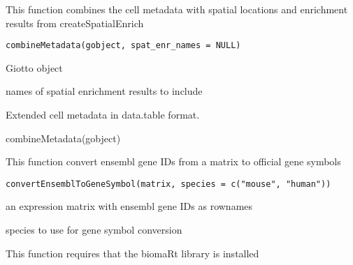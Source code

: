 \documentclass[a4paper]{book}
\begin{document}
%
\begin{Description}\relax
This function combines the cell metadata with spatial locations and enrichment results from createSpatialEnrich
\end{Description}
%
\begin{Usage}
\begin{verbatim}
combineMetadata(gobject, spat_enr_names = NULL)
\end{verbatim}
\end{Usage}
%
\begin{Arguments}
\begin{ldescription}
\item[\code{gobject}] Giotto object

\item[\code{spat\_enr\_names}] names of spatial enrichment results to include
\end{ldescription}
\end{Arguments}
%
\begin{Value}
Extended cell metadata in data.table format.
\end{Value}
%
\begin{Examples}
\begin{ExampleCode}
    combineMetadata(gobject)
\end{ExampleCode}
\end{Examples}
%
\begin{Description}\relax
This function convert ensembl gene IDs from a matrix to official gene symbols
\end{Description}
%
\begin{Usage}
\begin{verbatim}
convertEnsemblToGeneSymbol(matrix, species = c("mouse", "human"))
\end{verbatim}
\end{Usage}
%
\begin{Arguments}
\begin{ldescription}
\item[\code{matrix}] an expression matrix with ensembl gene IDs as rownames

\item[\code{species}] species to use for gene symbol conversion
\end{ldescription}
\end{Arguments}
%
\begin{Details}\relax
This function requires that the biomaRt library is installed
\end{Details}
\end{document}
